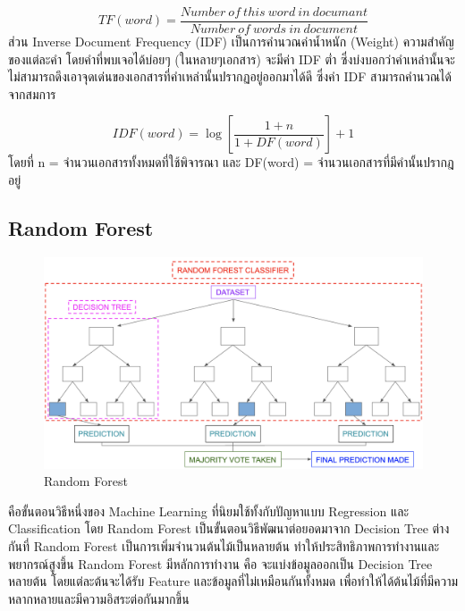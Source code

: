 \documentclass[12pt,oneside,openright,a4paper]{cpe-thai-project}
\begin{document}
    \[ TF(word) = \frac{Number\ of\ this\ word\ in\ documant}{Number\ of\ words\ in\ document} \] 
    \hspace{1cm}ส่วน Inverse Document Frequency (IDF) เป็นการคำนวณค่าน้ำหนัก (Weight) ความสำคัญของแต่ละคำ โดยคำที่พบเจอได้บ่อยๆ (ในหลายๆเอกสาร) 
    จะมีค่า IDF ต่ำ ซึ่งบ่งบอกว่าคำเหล่านั้นจะไม่สามารถดึงเอาจุดเด่นของเอกสารที่คำเหล่านั้นปรากฏอยู่ออกมาได้ดี ซึ่งค่า IDF สามารถคำนวณได้จากสมการ \cite{tfidf} 

    \[ IDF(word) = \log\left[\frac{1 + n}{1 + DF(word)}\right]+1 \] 
    \hspace{1cm} โดยที่ n = จำนวนเอกสารทั้งหมดที่ใช้พิจารณา และ DF(word) = จำนวนเอกสารที่มีคำนั้นปรากฎอยู่
  \subsection{Random Forest}
    
    \begin{figure}[!ht]\centering
      \includegraphics[width=13cm]{./img/tree.png}
      \caption{Random Forest}\label{fig:tree}
    \end{figure} 
    \hspace{1cm}คือขั้นตอนวิธีหนึ่งของ Machine Learning ที่นิยมใช้ทั้งกับปัญหาแบบ Regression และ Classification โดย Random Forest 
    เป็นขั้นตอนวิธีพัฒนาต่อยอดมาจาก Decision Tree ต่างกันที่ Random Forest เป็นการเพิ่มจำนวนต้นไม้เป็นหลายต้น ทำให้ประสิทธิภาพการทำงานและพยากรณ์สูงขึ้น 
    Random Forest มีหลักการทำงาน คือ จะแบ่งข้อมูลออกเป็น Decision Tree หลายต้น โดยแต่ละต้นจะได้รับ Feature และข้อมูลที่ไม่เหมือนกันทั้งหมด 
    เพื่อทำให้ได้ต้นไม้ที่มีความหลากหลายและมีความอิสระต่อกันมากขึ้น \cite{data_sci} 
\end{document}
